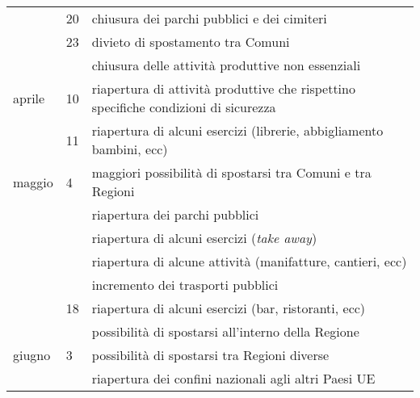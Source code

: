 \begin{table}[ht]
\begin{tabular}{lll}
                    & 20 & chiusura dei parchi pubblici e dei cimiteri\\
                    & 23 & divieto di spostamento tra Comuni\\
                    &    & chiusura delle attività produttive non essenziali\\
        aprile      & 10 & riapertura di attività produttive che rispettino specifiche condizioni di sicurezza\\
                    & 11 & riapertura di alcuni esercizi (librerie, abbigliamento bambini, ecc)\\
        maggio      &  4 & maggiori possibilità di spostarsi tra Comuni e tra Regioni\\
                    &    & riapertura dei parchi pubblici\\
                    &    & riapertura di alcuni esercizi (\textit{take away})\\
                    &    & riapertura di alcune attività (manifatture, cantieri, ecc)\\
                    &    & incremento dei trasporti pubblici\\
                    & 18 & riapertura di alcuni esercizi (bar, ristoranti, ecc)\\
                    &    & possibilità di spostarsi all'interno della Regione\\
        giugno      &  3 & possibilità di spostarsi tra Regioni diverse\\
                    &    & riapertura dei confini nazionali agli altri Paesi UE\\
    \bottomrule                
    \end{tabular}
    \label{tab:cronistoria}
\end{table}

